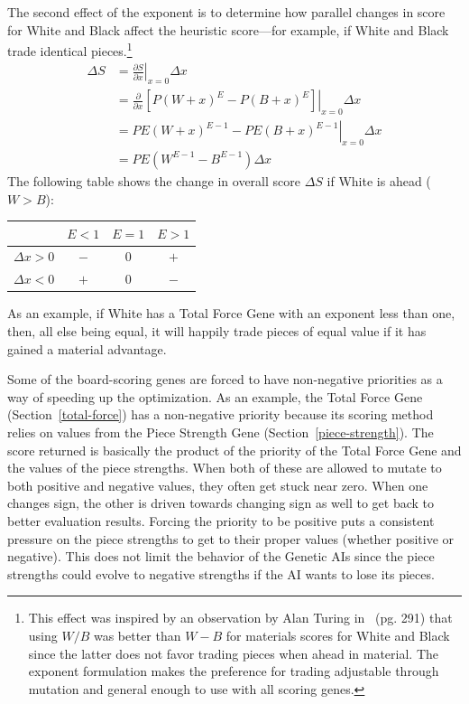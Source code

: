 \documentclass[letterpaper]{article}
\renewcommand{\_}{\allowbreak\textunderscore\allowbreak}
\begin{document}
The second effect of the exponent is to determine how parallel changes in score for White and Black affect the heuristic score---for example, if White and Black trade identical pieces.\footnote{This effect was inspired by an observation by Alan Turing in~\cite{turing-chess} (pg. 291) that using \(W/B\) was better than \(W-B\) for materials scores for White and Black since the latter does not favor trading pieces when ahead in material. The exponent formulation makes the preference for trading adjustable through mutation and general enough to use with all scoring genes.}
\begin{align*}
\Delta S &= \left.\frac{\partial S}{\partial x}\right|_{x = 0} \Delta x \\
         &= \left.\frac{\partial}{\partial x}\left[P{(W+x)}^E - P{(B+x)}^E\right]\right|_{x = 0} \Delta x \\
         &= \left.PE{(W+x)}^{E-1} - PE{(B+x)}^{E-1}\right|_{x = 0} \Delta x \\
         &= PE\left(W^{E-1} - B^{E-1}\right) \Delta x
\end{align*}
The following table shows the change in overall score \(\Delta S\) if White is ahead (\(W > B\)):
\begin{center}
\begin{tabular}[htb]{l c c c}
						& \(E < 1\)		& \(E = 1\)		& \(E > 1\) \\
\toprule
\(\Delta x > 0\)		& \(-\)		& \(0\)			& \(+\)	\\
\(\Delta x < 0\)		& \(+\)		& \(0\)			& \(-\)	\\
\end{tabular}
\end{center}
As an example, if White has a Total Force Gene with an exponent less than one, then, all else being equal, it will happily trade pieces of equal value if it has gained a material advantage.

Some of the board-scoring genes are forced to have non-negative priorities as a way of speeding up the optimization. As an example, the Total Force Gene (Section~\ref{total-force}) has a non-negative priority because its scoring method relies on values from the Piece Strength Gene (Section~\ref{piece-strength}). The score returned is basically the product of the priority of the Total Force Gene and the values of the piece strengths. When both of these are allowed to mutate to both positive and negative values, they often get stuck near zero. When one changes sign, the other is driven towards changing sign as well to get back to better evaluation results. Forcing the priority to be positive puts a consistent pressure on the piece strengths to get to their proper values (whether positive or negative). This does not limit the behavior of the Genetic AIs since the piece strengths could evolve to negative strengths if the AI wants to lose its pieces.
\end{document}
